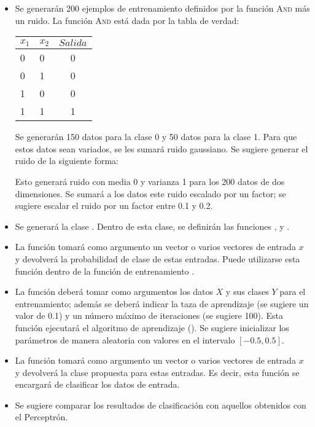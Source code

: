 \begin{itemize}
    \item Se generarán 200 ejemplos de entrenamiento definidos por la función \textsc{And} más un ruido. La función \textsc{And} está dada por la tabla de verdad:
    \begin{center}
        \begin{tabular}{ l l | c }
          $x_1$ & $x_2$ & $Salida$\\ \hline
          0 & 0  & 0 \\ \hline
          0 & 1 &  0  \\ \hline
          1 & 0 & 0  \\ \hline
          1 & 1 & 1  \\
        \end{tabular}
    \end{center}
    Se generarán 150 datos para la clase 0 y 50 datos para la clase 1. Para que estos datos sean variados, se les sumará ruido gaussiano. Se sugiere generar el ruido de la siguiente forma:
    \begin{center}
    \end{center}
    Esto generará ruido con media 0 y varianza 1 para los 200 datos de dos dimensiones. Se sumará a los datos este ruido escalado por un factor; se sugiere escalar el ruido por un factor entre 0.1 y 0.2.

    \item Se generará la clase . Dentro de esta clase, se definirán las funciones ,  y .

    \item La función  tomará como argumento un vector o varios vectores de entrada $x$ y devolverá la probabilidad de clase de estas entradas. Puede utilizarse esta función dentro de la función de entrenamiento .

    \item La función  deberá tomar como argumentos los datos $X$ y sus clases $Y$ para el entrenamiento; además se deberá indicar la taza de aprendizaje (se sugiere un valor de 0.1) y un número máximo de iteraciones (se sugiere 100). Esta función ejecutará el algoritmo de aprendizaje (). Se sugiere inicializar los parámetros de manera aleatoria con valores en el intervalo $[-0.5,0.5]$.

    \item La función  tomará como argumento un vector o varios vectores de entrada $x$ y devolverá la clase propuesta para estas entradas. Es decir, esta función se encargará de clasificar los datos de entrada.

    \item Se sugiere comparar los resultados de clasificación con aquellos obtenidos con el Perceptrón. 
\end{itemize}


